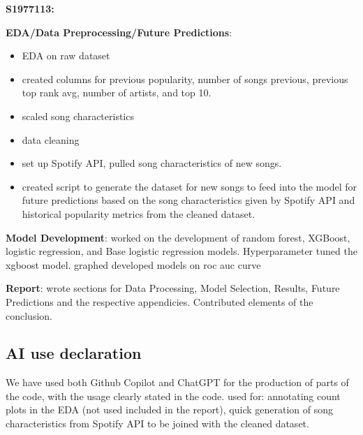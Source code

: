 \documentclass{article}
\begin{document}
\textbf{S1977113:}

\textbf{EDA/Data Preprocessing/Future Predictions}:
\begin{itemize}
    \item EDA on raw dataset
    \item created columns for previous popularity, number of songs previous, previous top rank avg, number of artists, and top 10.
    \item scaled song characteristics
    \item data cleaning
    \item set up Spotify API, pulled song characteristics of new songs.
    \item created script to generate the dataset for new songs to feed into the model for future predictions based on the song characteristics given by Spotify API and historical popularity metrics from the cleaned dataset.
\end{itemize}

\textbf{Model Development}: worked on the development of random forest, XGBoost, logistic regression, and Base logistic regression models. Hyperparameter tuned the xgboost model. graphed developed models on roc auc curve

\textbf{Report}: wrote sections for Data Processing, Model Selection, Results, Future Predictions and the respective appendicies. Contributed elements of the conclusion. 





\subsection{AI use declaration}

We have used both Github Copilot and ChatGPT for the production of parts of the code, with the usage clearly stated in the code. 
used for: annotating count plots in the EDA (not used included in the report), quick generation of song characteristics from Spotify API to be joined with the cleaned dataset. 
\end{document}
